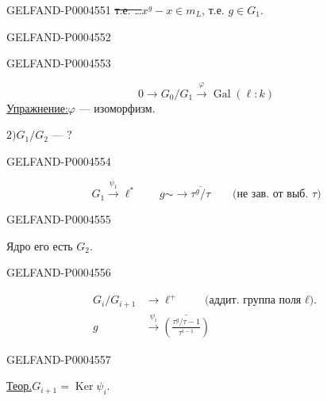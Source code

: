 \begin{GelfandAdjacentEvidence}{GELFAND-P000455}{1}
\sout{т.е. \ldots}\qquad $x^g-x\in m_L$, т.е. $g\in G_1$.
\end{GelfandAdjacentEvidence}
\begin{GelfandAdjacentEvidence}{GELFAND-P000455}{2}

\end{GelfandAdjacentEvidence}
\begin{GelfandAdjacentEvidence}{GELFAND-P000455}{3}


\[
0\longrightarrow G_0/G_1\xrightarrow{\varphi}\operatorname{Gal}(\ell:k)
\]
\underline{Упражнение:}\quad $\varphi$ — изоморфизм.

$2)$\quad $G_1/G_2$ — $?$
\end{GelfandAdjacentEvidence}
\begin{GelfandAdjacentEvidence}{GELFAND-P000455}{4}


\[
G_1\xrightarrow{\psi_1}\ell^*
\qquad
g\mathrel{\sim\!\longrightarrow}\overline{\tau^g/\tau}
\qquad\text{(не зав. от выб. $\tau$)}
\]
\end{GelfandAdjacentEvidence}
\begin{GelfandAdjacentEvidence}{GELFAND-P000455}{5}


Ядро его есть $G_2$.
\end{GelfandAdjacentEvidence}
\begin{GelfandAdjacentEvidence}{GELFAND-P000455}{6}


\[
\begin{aligned}
G_i/G_{i+1}&\longrightarrow\ell^+
   \qquad\text{(аддит. группа поля $\ell$).}\\
g&\xrightarrow{\psi_i}
\overline{\left(\frac{\tau^g/\tau-1}{\tau^{i-1}}\right)}
\end{aligned}
\]
\end{GelfandAdjacentEvidence}
\begin{GelfandAdjacentEvidence}{GELFAND-P000455}{7}

\underline{Теор.}\quad $G_{i+1}=\operatorname{Ker}\psi_i$.
\end{GelfandAdjacentEvidence}
